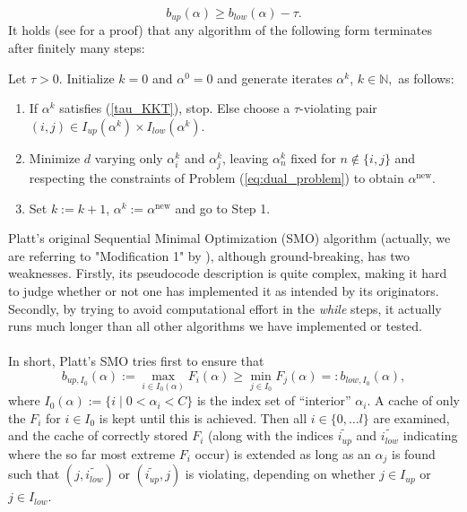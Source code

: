 \begin{equation*}\label{tau_KKT}
b_{up}(\alpha) \geq b_{low}(\alpha) - \tau.
\end{equation*}
It holds (see \cite{Keerthi2002} for a proof) that any algorithm of the following form terminates after finitely many steps:
\begin{algorithm}\label{GSMO} Let $\tau > 0$. Initialize $k = 0 $ and $\alpha^0 = 0$ and generate iterates $\alpha^k$, $k \in \mathbb{N},$ as follows: 
\begin{enumerate}
\item If $\alpha^k$ satisfies (\ref{tau_KKT}), stop. Else choose a $\tau$-violating pair $(i,j) \in I_{up}(\alpha^k) \times I_{low}(\alpha^k)$.
\item Minimize $d$ varying only $\alpha^k_i$ and $\alpha^k_j$, leaving $\alpha^k_n$ fixed for $n \notin \{i,j\}$ and respecting the constraints of Problem (\ref{eq:dual_problem}) to obtain $\alpha^{\text{new}}$.
\item Set $k := k+1$, $\alpha^k := \alpha^{\text{new}}$ and go to Step 1.
\end{enumerate}
\end{algorithm} 
Platt's original Sequential Minimal Optimization (SMO) algorithm (actually, we are referring to "Modification 1" by \cite{KeerthiShevade}), although ground-breaking, has two weaknesses. Firstly, its pseudocode description is quite complex, making it hard to judge whether or not one has implemented it as intended by its originators. Secondly, by trying to avoid computational effort in the \textit{while} steps, it actually runs much longer than all other algorithms we have implemented or tested.\\\\
In short, Platt's SMO tries first to ensure that
\[
b_{up,I_0}(\alpha) := \max_{i \in I_0(\alpha)} F_i(\alpha) \geq \min_{j \in I_0} F_j(\alpha) =: b_{low,I_0}(\alpha),
\]
where $I_0(\alpha) := \{ i  \mid  0 < \alpha_i < C \}$ is the index set of ``interior'' $\alpha_i$. A cache of only the $F_i$ for $i \in I_0$ is kept until this is achieved. Then all $i \in \{0,\ldots l\}$ are examined, and the cache of correctly stored $F_i$ (along with the indices $\widetilde{i_{up}}$ and $\widetilde{i_{low}}$ indicating where the so far most extreme $F_i$ occur) is extended as long as an $\alpha_j$ is found such that $(j,\widetilde{i_{low}})$ or $(\widetilde{i_{up}},j)$ is violating, depending on whether $j \in I_{up}$ or $j \in I_{low}$.\\\\
